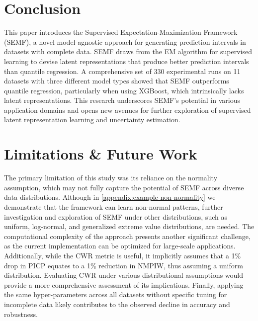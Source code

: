 \documentclass{article}
\begin{document}
\section{Conclusion}
\label{conclusion}
This paper introduces the Supervised Expectation-Maximization Framework (SEMF), a novel model-agnostic approach for generating prediction intervals in datasets with complete data. SEMF draws from the EM algorithm for supervised learning to devise latent representations that produce better prediction intervals than quantile regression. A comprehensive set of 330 experimental runs on 11 datasets with three different model types showed that SEMF outperforms quantile regression, particularly when using XGBoost, which intrinsically lacks latent representations. This research underscores SEMF's potential in various application domains and opens new avenues for further exploration of supervised latent representation learning and uncertainty estimation.

\section{Limitations \& Future Work}
The primary limitation of this study was its reliance on the normality assumption, which may not fully capture the potential of SEMF across diverse data distributions. Although in \autoref{appendix:example-non-normality} we demonstrate that the framework can learn non-normal patterns, further investigation and exploration of SEMF under other distributions, such as uniform, log-normal, and generalized extreme value distributions, are needed. The computational complexity of the approach presents another significant challenge, as the current implementation can be optimized for large-scale applications. Additionally, while the CWR metric is useful, it implicitly assumes that a 1\% drop in PICP equates to a 1\% reduction in NMPIW, thus assuming a uniform distribution. Evaluating CWR under various distributional assumptions would provide a more comprehensive assessment of its implications. 
Finally, applying the same hyper-parameters across all datasets without specific tuning for incomplete data likely contributes to the observed decline in accuracy and robustness.
\end{document}

